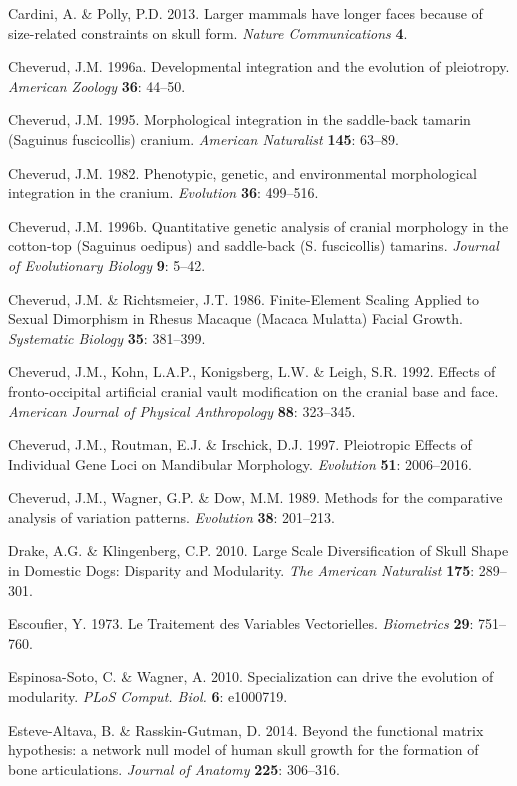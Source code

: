 \documentclass[11pt,twoside]{report}
\begin{document}
Cardini, A. \& Polly, P.D. 2013. Larger mammals have longer faces
because of size-related constraints on skull form. \emph{Nature
Communications} \textbf{4}.

Cheverud, J.M. 1996a. Developmental integration and the evolution of
pleiotropy. \emph{American Zoology} \textbf{36}: 44--50.

Cheverud, J.M. 1995. Morphological integration in the saddle-back
tamarin (Saguinus fuscicollis) cranium. \emph{American Naturalist}
\textbf{145}: 63--89.

Cheverud, J.M. 1982. Phenotypic, genetic, and environmental
morphological integration in the cranium. \emph{Evolution} \textbf{36}:
499--516.

Cheverud, J.M. 1996b. Quantitative genetic analysis of cranial
morphology in the cotton-top (Saguinus oedipus) and saddle-back (S.
fuscicollis) tamarins. \emph{Journal of Evolutionary Biology}
\textbf{9}: 5--42.

Cheverud, J.M. \& Richtsmeier, J.T. 1986. Finite-Element Scaling Applied
to Sexual Dimorphism in Rhesus Macaque (Macaca Mulatta) Facial Growth.
\emph{Systematic Biology} \textbf{35}: 381--399.

Cheverud, J.M., Kohn, L.A.P., Konigsberg, L.W. \& Leigh, S.R. 1992.
Effects of fronto-occipital artificial cranial vault modification on the
cranial base and face. \emph{American Journal of Physical Anthropology}
\textbf{88}: 323--345.

Cheverud, J.M., Routman, E.J. \& Irschick, D.J. 1997. Pleiotropic
Effects of Individual Gene Loci on Mandibular Morphology.
\emph{Evolution} \textbf{51}: 2006--2016.

Cheverud, J.M., Wagner, G.P. \& Dow, M.M. 1989. Methods for the
comparative analysis of variation patterns. \emph{Evolution}
\textbf{38}: 201--213.

Drake, A.G. \& Klingenberg, C.P. 2010. Large Scale Diversification of
Skull Shape in Domestic Dogs: Disparity and Modularity. \emph{The
American Naturalist} \textbf{175}: 289--301.

Escoufier, Y. 1973. Le Traitement des Variables Vectorielles.
\emph{Biometrics} \textbf{29}: 751--760.

Espinosa-Soto, C. \& Wagner, A. 2010. Specialization can drive the
evolution of modularity. \emph{PLoS Comput. Biol.} \textbf{6}: e1000719.

Esteve-Altava, B. \& Rasskin-Gutman, D. 2014. Beyond the functional
matrix hypothesis: a network null model of human skull growth for the
formation of bone articulations. \emph{Journal of Anatomy} \textbf{225}:
306--316.
\end{document}
